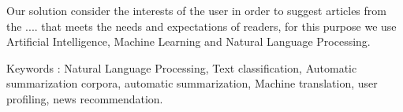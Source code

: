 Our solution consider the interests of the user in order to suggest articles from the  ....
that meets the needs and expectations of readers, for this purpose we use Artificial Intelligence, Machine Learning and Natural Language Processing.

Keywords : Natural Language Processing, Text classification, Automatic summarization corpora, automatic summarization, Machine translation, user profiling, news recommendation. 




